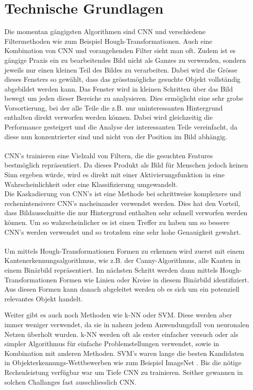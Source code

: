 \section{Technische Grundlagen}
\label{sec:technicalBase}
Die momentan gängigsten Algorithmen sind \gls{CNN} \parencite{li2015convolutional} und verschiedene Filtermethoden wie zum Beispiel Hough-Transformationen\parencite{ye2015new}. Auch eine Kombination von \gls{CNN} und vorangehenden Filter sieht man oft. Zudem ist es gängige Praxis ein zu bearbeitendes Bild nicht als Ganzes zu verwenden, sondern jeweils nur einen kleinen Teil des Bildes zu verarbeiten. Dabei wird die Grösse dieses Fensters so gewählt, dass das grösstmögliche gesuchte Objekt vollständig abgebildet werden kann. Das Fenster wird in kleinen Schritten über das Bild bewegt um jeden dieser Bereiche zu analysieren. Dies ermöglicht eine sehr grobe Vorsortierung, bei der alle Teile die z.B. nur uninteressanten Hintergrund enthalten direkt verworfen werden können. Dabei wird gleichzeitig die Performance gesteigert und die Analyse der interessanten Teile vereinfacht, da diese nun konzentrierter sind und nicht von der Position im Bild abhängig.\\
\\
\gls{CNN}’s trainieren eine Vielzahl von Filtern, die die gesuchten Features bestmöglich repräsentiert. Da dieses Produkt als Bild für Menschen jedoch keinen Sinn ergeben würde, wird es direkt mit einer Aktivierungsfunktion in eine Wahrscheinlichkeit oder eine Klassifizierung umgewandelt.\\
Die Kaskadierung von \gls{CNN}’s ist eine Methode bei schrittweise komplexere und rechenintensivere \gls{CNN}’s nacheinander verwendet werden. Dies hat den Vorteil, dass Bildausschnitte die nur Hintergrund enthalten sehr schnell verworfen werden können. Um so wahrscheinlicher es ist einen Treffer zu haben um so bessere \gls{CNN}’s werden verwendet und so trotzdem eine sehr hohe Genauigkeit gewahrt.\\
\\
Um mittels Hough-Transformationen Formen zu erkennen wird zuerst mit einem Kantenerkennungsalgorithmus, wie z.B. der Canny-Algorithmus, alle Kanten in einem Binärbild repräsentiert. Im nächsten Schritt werden dann mittels Hough-Transformationen Formen wie Linien oder Kreise in diesem Binärbild identifiziert. Aus diesen Formen kann danach abgeleitet werden ob es sich um ein potenziell relevantes Objekt handelt.

Weiter gibt es auch noch Methoden wie \gls{k-NN} oder \gls{SVM}. Diese werden aber immer weniger verwendet, da sie in nahezu jedem Anwendungsfall von neuronalen Netzen überholt wurden. \gls{k-NN} werden oft als erster einfacher versuch oder als simpler Algorithmus für einfache Problemstellungen verwendet, sowie in Kombination mit anderen Methoden. \gls{SVM}'s waren lange die besten Kandidaten in Objekterkennungs-Wettbewerben wie zum Beispiel ImageNet \parencite{ILSVRC15}. Bis die nötige Rechenleistung verfügbar war um Tiefe \gls{CNN} zu trainieren. Seither gewannen in solchen Challanges fast ausschliesslich \gls{CNN}.

